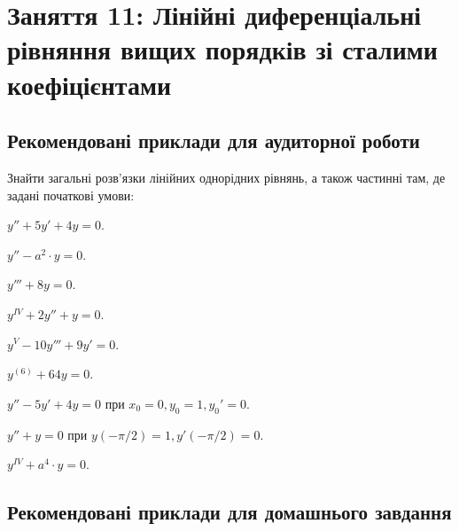 \section*{Заняття 11: Лінійні диференціальні рівняння вищих порядків зі сталими коефіцієнтами}

\subsection*{Рекомендовані приклади для аудиторної роботи}

Знайти загальні розв'язки лінійних однорідних рівнянь, а також частинні там, де задані початкові умови:

\begin{problem}
	$y'' + 5 y' + 4 y = 0$.
\end{problem}

\begin{problem}
	$y'' - a^2 \cdot y = 0$.
\end{problem}

\begin{problem}
	$y''' + 8 y = 0$.
\end{problem}

\begin{problem}
	$y^{IV} + 2 y'' + y = 0$.
\end{problem}

\begin{problem}
	$y^V - 10 y''' + 9 y' = 0$.
\end{problem}

\begin{problem}
	$y^{(6)} + 64 y = 0$.
\end{problem}

\begin{problem}
	$y'' - 5 y' + 4 y = 0$ при $x_0 = 0, y_0 = 1, y_0' = 0$.
\end{problem}

\begin{problem}
	$y'' + y = 0$ при $y(-\pi / 2) = 1, y'(-\pi / 2) = 0$.
\end{problem}

\begin{problem}
	$y^{IV} + a^4 \cdot y = 0$.
\end{problem}

\subsection*{Рекомендовані приклади для домашнього завдання}

